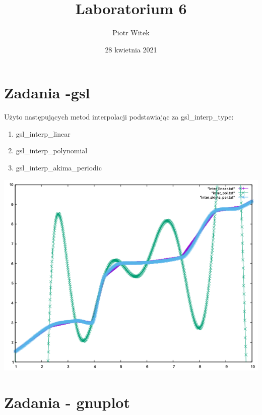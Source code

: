 \documentclass[5]{article}
\title{Laboratorium 6}
\author{Piotr Witek}
\date{28 kwietnia 2021}
\begin{document}

\maketitle


\section{Zadania -gsl}

\hspace{4mm} Użyto następujących metod interpolacji podstawiając za gsl\_interp\_type: 
\begin{enumerate}
    \item gsl\_interp\_linear
    \item gsl\_interp\_polynomial
    \item gsl\_interp\_akima\_periodic
\end{enumerate}

\begin{center}
    \includegraphics[scale=0.6]{zad1_2.png} \par
    \vspace{3mm}
    
\end{center}

\newpage

\section{Zadania - gnuplot}
\end{document}
